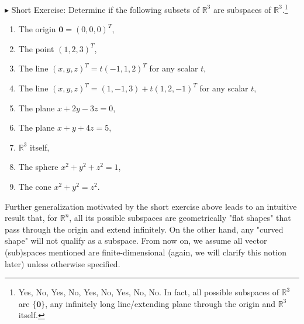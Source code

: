 $\blacktriangleright$ Short Exercise: Determine if the following subsets of $\mathbb{R}^3$ are subspaces of $\mathbb{R}^3$.\footnote{Yes, No, Yes, No, Yes, No, Yes, No, No. In fact, all possible subspaces of $\mathbb{R}^3$ are $\{\textbf{0}\}$, any infinitely long line/extending plane through the origin and $\mathbb{R}^3$ itself.}
\begin{enumerate}[label=(\alph*)]
\item The origin $\textbf{0} = (0,0,0)^T$,
\item The point $(1,2,3)^T$,
\item The line $(x,y,z)^T = t(-1, 1, 2)^T$ for any scalar $t$,
\item The line $(x,y,z)^T = (1, -1, 3) + t(1, 2, -1)^T$ for any scalar $t$,
\item The plane $x + 2y - 3z = 0$,
\item The plane $x + y + 4z = 5$,
\item $\mathbb{R}^3$ itself,
\item The sphere $x^2 + y^2 + z^2 = 1$,
\item The cone $x^2 + y^2 = z^2$.
\end{enumerate}
Further generalization motivated by the short exercise above leads to an intuitive result that, for $\mathbb{R}^n$, all its possible subspaces are geometrically "flat shapes" that pass through the origin and extend infinitely. On the other hand, any "curved shape" will not qualify as a subspace. From now on, we assume all vector (sub)spaces mentioned are finite-dimensional (again, we will clarify this notion later) unless otherwise specified.


